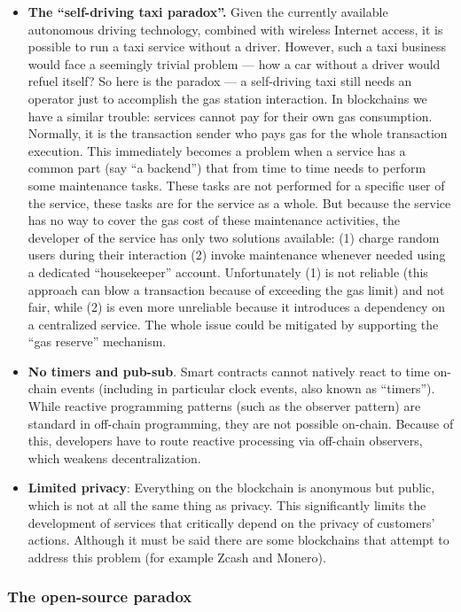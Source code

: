 \documentclass[a4paper]{article}
\begin{document}
\begin{itemize}
  \item \textbf{The ``self-driving taxi paradox''.} Given the currently available autonomous driving technology, combined with wireless Internet access, it is possible to run a taxi service without a driver. However, such a taxi business would face a seemingly trivial problem --- how a car without a driver would refuel itself? So here is the paradox --- a self-driving taxi still needs an operator just to accomplish the gas station interaction. In blockchains we have a similar trouble: services cannot pay for their own gas consumption. Normally, it is the transaction sender who pays gas for the whole transaction execution. This immediately becomes a problem when a service has a common part (say ``a backend'') that from time to time needs to perform some maintenance tasks. These tasks are not performed for a specific user of the service, these tasks are for the service as a whole. But because the service has no way to cover the gas cost of these maintenance activities, the developer of the service has only two solutions available: (1) charge random users during their interaction (2) invoke maintenance whenever needed using a dedicated ``housekeeper'' account. Unfortunately (1) is not reliable (this approach can blow a transaction because of exceeding the gas limit) and not fair, while (2) is even more unreliable because it introduces a dependency on a centralized service. The whole issue could be mitigated by supporting the ``gas reserve'' mechanism.
  \item \textbf{No timers and pub-sub}. Smart contracts cannot natively react to time on-chain events (including in particular clock events, also known as ``timers''). While reactive programming patterns (such as the observer pattern) are standard in off-chain programming, they are not possible on-chain. Because of this, developers have to route reactive processing via off-chain observers, which weakens decentralization.
  \item \textbf{Limited privacy}: Everything on the blockchain is anonymous but public, which is not at all the same thing as privacy. This significantly limits the development of services that critically depend on the privacy of customers' actions. Although it must be said there are some blockchains that attempt to address this problem (for example Zcash and Monero).
\end{itemize}

\subsubsection{The open-source paradox}
\end{document}

